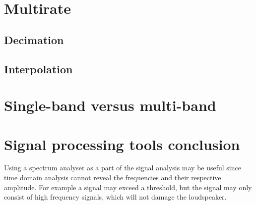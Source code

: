\section{Multirate}

\subsection*{Decimation}

\subsection*{Interpolation}

\section{Single-band versus multi-band}

\section{Signal processing tools conclusion}
Using a spectrum analyser as a part of the signal analysis may be useful since time domain analysis cannot reveal the frequencies and their respective amplitude. For example a signal may exceed a threshold, but the signal may only consist of high frequency signals, which will not damage the loudspeaker. 

